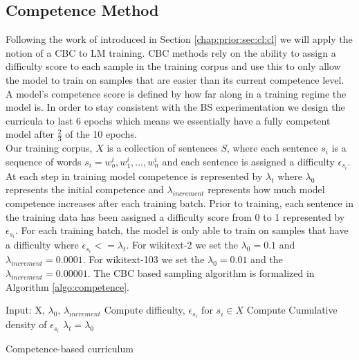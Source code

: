 \subsection{Competence Method}
Following the work of \cite{Platanios2019CompetencebasedCL} introduced in Section \ref{chap:prior:sec:cl:cl} we will apply the notion of a CBC to LM training. CBC methods rely on the ability to assign a difficulty score to each sample in the training corpus and use this to only allow the model to train on samples that are easier than its current competence level. A model's competence score is defined by how far along in a training regime the model is. In order to stay consistent with the BS experimentation we design the curricula to last 6 epochs which means we essentially have a fully competent model after $\frac{2}{3}$ of the 10 epochs. \\
Our training corpus, $X$ is a collection of sentences $S$, where each sentence $s_i$ is a sequence of words $s_i= w_o^i,w_1^i,...,w_n^i$ and each sentence is assigned a difficulty $\epsilon_{s_i}$. At each step in training model competence is represented by $\lambda_t$ where $\lambda_0$ represents the initial competence and $\lambda_{increment}$ represents how much model competence increases after each training batch. Prior to training, each sentence in the training data has been assigned a difficulty score from 0 to 1 represented by $\epsilon_{s_i}$. For each training batch, the model is only able to train on samples that have a difficulty where $\epsilon_{s_i} <= \lambda_t$. For wikitext-2 we set the $\lambda_0 = 0.1$ and $\lambda_{increment} = 0.0001$. For wikitext-103 we set the $\lambda_0 = 0.01$ and the $\lambda_{increment} = 0.00001$. The CBC based sampling algorithm is formalized in Algorithm \ref{algo:competence}. \\
\begin{algorithm}[H]
\label{algo:competence}
\SetAlgoLined
{}
Input: X, $\lambda_0$, $\lambda_{increment}$ \;
Compute difficulty, $\epsilon_{s_i}$ for $s_i \in X$\;
Compute Cumulative density of $\epsilon_{s_i}$\;
$\lambda_t = \lambda_0$\;
\caption{Competence-based curriculum}
\end{algorithm}
